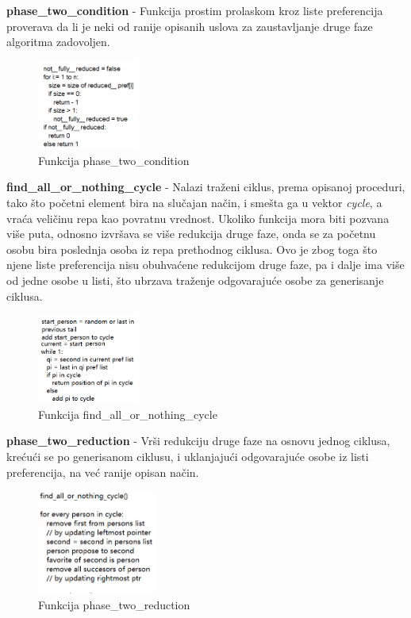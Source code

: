 \documentclass[a4paper]{article}
\begin{document}
\textbf{phase\_two\_condition} - Funkcija prostim prolaskom kroz liste preferencija proverava da li je neki od ranije opisanih uslova za zaustavljanje druge faze algoritma zadovoljen.


\begin{figure}[H]
    \centering
    \includegraphics[width=0.3\textwidth]{p2condition.png}
    \caption{Funkcija phase\_two\_condition}
    \label{p2c}
\end{figure}

\textbf{find\_all\_or\_nothing\_cycle} - Nalazi traženi ciklus, prema opisanoj proceduri, tako što početni element bira na slučajan način, i smešta ga u vektor \textit{cycle}, a vraća veličinu repa kao povratnu vrednost. Ukoliko funkcija mora biti pozvana više puta, odnosno izvršava se više redukcija druge faze, onda se za početnu osobu bira poslednja osoba iz repa prethodnog ciklusa. Ovo je zbog toga što njene liste preferencija nisu obuhvaćene redukcijom druge faze, pa i dalje ima više od jedne osobe u listi, što ubrzava traženje odgovarajuće osobe za generisanje ciklusa.

\begin{figure}[H]
    \centering
    \includegraphics[width=0.3\textwidth]{allornothingcycle.png}
    \caption{Funkcija find\_all\_or\_nothing\_cycle}
    \label{allorn}
\end{figure}

\textbf{phase\_two\_reduction} - Vrši redukciju druge faze na osnovu jednog ciklusa, krećući se po generisanom ciklusu, i uklanjajući odgovarajuće osobe iz listi preferencija, na već ranije opisan način.

\begin{figure}[H]
    \centering
    \includegraphics[width=0.35\textwidth]{p2reduction.png}
    \caption{Funkcija phase\_two\_reduction}
    \label{p2r}
\end{figure}
\end{document}
